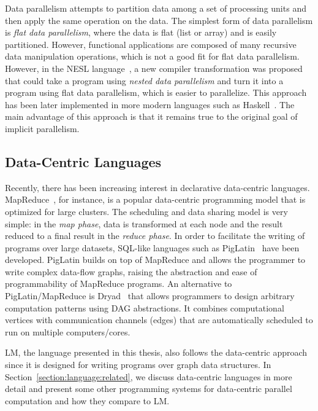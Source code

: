 Data parallelism attempts to partition data among a set of processing units and
then apply the same operation on the data. The simplest form of data parallelism
is \emph{flat data parallelism}, where the data is flat (list or array) and is
easily partitioned. However, functional applications are composed of many recursive
data manipulation operations, which is not a good fit for flat data parallelism.
However, in the NESL language~\cite{Blelloch:1996:PPA:227234.227246}, a new compiler
transformation was proposed that could take a program using \emph{nested data
parallelism} and turn it into a program using flat data parallelism, which is
easier to parallelize. This approach has been later implemented in more
modern languages such as Haskell~\cite{Chakravarty07dataparallel}. The main
advantage of this approach is that it remains true to the original goal of
implicit parallelism.

\subsection{Data-Centric Languages}

Recently, there has been increasing interest in declarative data-centric
languages. MapReduce~\cite{Dean:2008:MSD:1327452.1327492}, for instance, is a
popular data-centric programming model that is optimized for large clusters. The
scheduling and data sharing model is very simple: in the \emph{map phase}, data
is transformed at each node and the result reduced to a final result in the
\emph{reduce phase}. In order to facilitate the writing of programs over large
datasets, SQL-like languages such as
PigLatin~\cite{Olston:2008:PLN:1376616.1376726} have been developed. PigLatin
builds on top of MapReduce and allows the programmer to write complex data-flow
graphs, raising the abstraction and ease of programmability of MapReduce
programs. An alternative to PigLatin/MapReduce is
Dryad~\cite{Isard:2007:DDD:1272996.1273005} that allows programmers to design
arbitrary computation patterns using DAG abstractions. It combines computational
vertices with communication channels (edges) that are automatically scheduled to
run on multiple computers/cores.

LM, the language presented in this thesis, also follows the data-centric
approach since it is designed for writing programs over graph data structures.
In Section~\ref{section:language:related}, we discuss data-centric languages in
more detail and present some other programming systems for data-centric parallel
computation and how they compare to LM.

